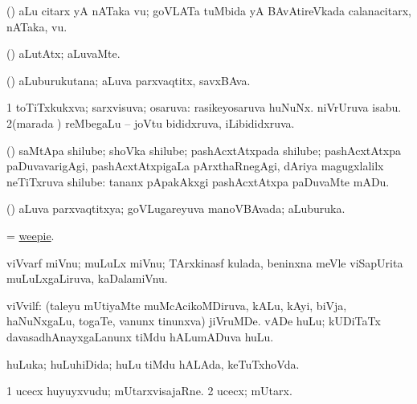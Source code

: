 \bentry
{} 
\gl{\nA}
\bmng
(\AmA) aLu citarx yA nATaka \mo vu; goVLATa tuMbida yA BAvAtireVkada calanacitarx, nATaka, \mo vu. 
\emng
\eentry

\bentry
{} 
\gl{\kirxvi}
\expl{}
\bmng
(\AmA) aLutAtx; aLuvaMte. 
\emng
\eentry

\bentry
{} 
\gl{\nA}
\expl{}
\bmng
(\AmA) aLuburukutana; aLuva parxvaqtitx, savxBAva. 
\emng
\eentry

\bentry
{} 
\gl{\gu}
\expl{}
\bmng
\bnum
\num{1} toTiTxkukxva; sarxvisuva; osaruva:  rasikeyosaruva huNuNx.  niVrUruva isabu. 
\num{2}(marada \vi) reMbegaLu -- joVtu bididxruva, iLibididxruva. 
\enum
\emng
\eentry

\bentry
{} 
\gl{\nA}
\expl{}
\bmng
(\ca) saMtApa shilube; shoVka shilube; pashAcxtAtxpada shilube; pashAcxtAtxpa paDuvavarigAgi, pashAcxtAtxpigaLa pArxthaRnegAgi, dAriya magugxlalilx neTiTxruva shilube:  tananx pApakAkxgi pashAcxtAtxpa paDuvaMte mADu. 
\emng
\eentry

\bentry
{} 
\gl{\gu}
\bmng
(\AmA) aLuva parxvaqtitxya; goVLugareyuva manoVBAvada; aLuburuka. 
\emng
\eentry

\bentry
{} 
\gl{\nA}
\expl{}
\bmng
= \hyperlink{weepie}{weepie}. 
\emng
\eentry

\bentry
{} 
\gl{\nA}
\expl{}
\bmng
viVvarf miVnu; muLuLx miVnu; TArxkinasf kulada, beninxna meVle viSapUrita muLuLxgaLiruva, kaDalamiVnu. 
\emng
\eentry

\bentry
{} 
\gl{\nA}
\expl{}
\bmng
viVvilf: 
\banum
{} (taleyu mUtiyaMte muMcAcikoMDiruva, kALu, kAyi, biVja, haNuNxgaLu, togaTe, \mo vanunx tinunxva) jiVruMDe.  
 vADe huLu; kUDiTaTx davasadhAnayxgaLanunx tiMdu hALumADuva huLu. 
\eanum
\emng
\eentry

\bentry
{} 
\gl{\gu}
\expl{}
\bmng
huLuka; huLuhiDida; huLu tiMdu hALAda, keTuTxhoVda. 
\emng
\eentry

\bentry
{} 
\gl{\nA}
\expl{}
\bmng
\bnum
\num{1} ucecx huyuyxvudu; mUtarxvisajaRne. 
\num{2} ucecx; mUtarx. 
\enum
\emng
\eentry

